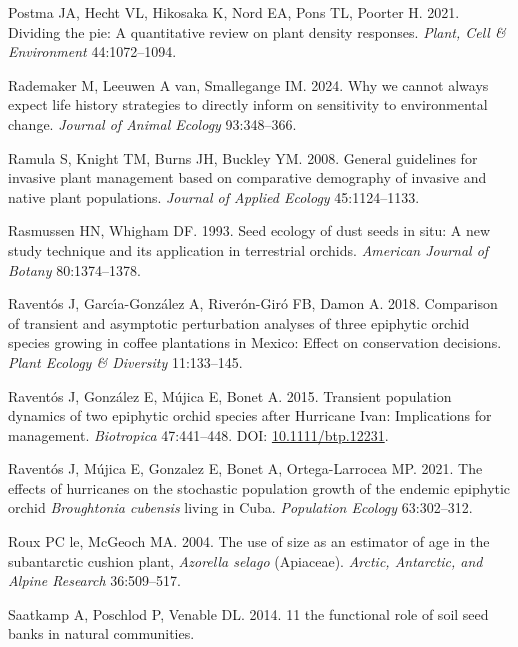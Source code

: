 \documentclass[
  12pt,
  letterpaper,
]{book}
\newlength{\cslhangindent}
\newenvironment{CSLReferences}[2] %
 {\begin{list}{}{%
  \setlength{\itemindent}{0pt}
  \setlength{\leftmargin}{0pt}
  \setlength{\parsep}{0pt}
  \ifodd #1
   \setlength{\leftmargin}{\cslhangindent}
   \setlength{\itemindent}{-1\cslhangindent}
  \fi
  \setlength{\itemsep}{#2\baselineskip}}}
 {\end{list}}
\begin{document}
\begin{CSLReferences}{1}{0}
Postma JA, Hecht VL, Hikosaka K, Nord EA, Pons TL, Poorter H. 2021.
Dividing the pie: A quantitative review on plant density responses.
\emph{Plant, Cell \& Environment} 44:1072--1094.

Rademaker M, Leeuwen A van, Smallegange IM. 2024. Why we cannot always
expect life history strategies to directly inform on sensitivity to
environmental change. \emph{Journal of Animal Ecology} 93:348--366.

Ramula S, Knight TM, Burns JH, Buckley YM. 2008. General guidelines for
invasive plant management based on comparative demography of invasive
and native plant populations. \emph{Journal of Applied Ecology}
45:1124--1133.

Rasmussen HN, Whigham DF. 1993. Seed ecology of dust seeds in situ: A
new study technique and its application in terrestrial orchids.
\emph{American Journal of Botany} 80:1374--1378.

Raventós J, Garcı́a-González A, Riverón-Giró FB, Damon A. 2018.
Comparison of transient and asymptotic perturbation analyses of three
epiphytic orchid species growing in coffee plantations in {M}exico:
Effect on conservation decisions. \emph{Plant Ecology \& Diversity}
11:133--145.

Raventós J, González E, Mújica E, Bonet A. 2015. Transient population
dynamics of two epiphytic orchid species after {H}urricane {I}van:
Implications for management. \emph{Biotropica} 47:441--448. DOI:
\href{https://doi.org/10.1111/btp.12231}{10.1111/btp.12231}.

Raventós J, Mújica E, Gonzalez E, Bonet A, Ortega-Larrocea MP. 2021. The
effects of hurricanes on the stochastic population growth of the endemic
epiphytic orchid \emph{{B}roughtonia {c}ubensis} living in {C}uba.
\emph{Population Ecology} 63:302--312.

Roux PC le, McGeoch MA. 2004. The use of size as an estimator of age in
the subantarctic cushion plant, \emph{{A}zorella selago} ({A}piaceae).
\emph{Arctic, Antarctic, and Alpine Research} 36:509--517.

Saatkamp A, Poschlod P, Venable DL. 2014. 11 the functional role of soil
seed banks in natural communities.


\end{CSLReferences}
\end{document}
